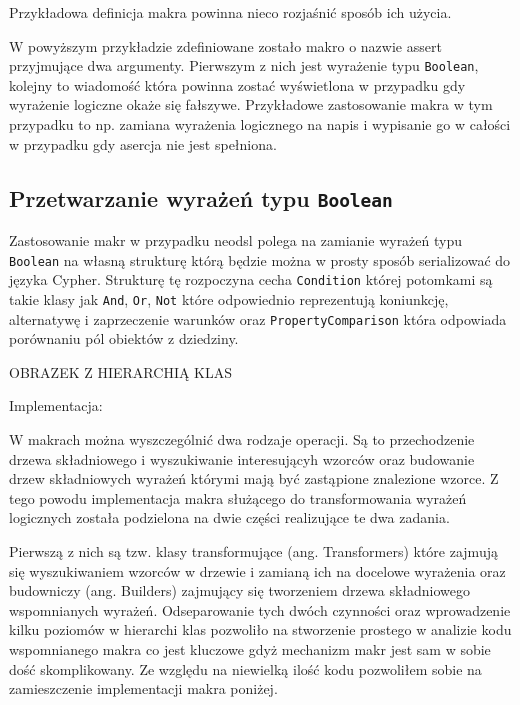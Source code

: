 \documentclass[brudnopis]{xmgr}
\begin{document}
Przykładowa definicja makra powinna nieco rozjaśnić sposób ich użycia.



W powyższym przykładzie zdefiniowane zostało makro o nazwie assert przyjmujące dwa argumenty. Pierwszym z nich jest wyrażenie typu \texttt{Boolean}, kolejny to wiadomość która powinna zostać wyświetlona w przypadku gdy wyrażenie logiczne okaże się fałszywe. Przykładowe zastosowanie makra w tym przypadku to np. zamiana wyrażenia logicznego na napis i wypisanie go w całości w przypadku gdy asercja nie jest spełniona.

\subsection{Przetwarzanie wyrażeń typu \texttt{Boolean}}

Zastosowanie makr w przypadku neodsl polega na zamianie wyrażeń typu \texttt{Boolean} na własną strukturę którą będzie można w prosty sposób serializować do języka Cypher. 
Strukturę tę rozpoczyna cecha \texttt{Condition} której potomkami są takie klasy jak \texttt{And}, \texttt{Or}, \texttt{Not} które odpowiednio reprezentują koniunkcję, alternatywę i zaprzeczenie warunków oraz \texttt{PropertyComparison} która odpowiada porównaniu pól obiektów z dziedziny.

OBRAZEK Z HIERARCHIĄ KLAS

Implementacja:

W makrach można wyszczególnić dwa rodzaje operacji. Są to przechodzenie drzewa składniowego i wyszukiwanie interesującyh wzorców oraz budowanie drzew składniowych wyrażeń którymi mają być zastąpione znalezione wzorce. Z tego powodu implementacja makra służącego do transformowania wyrażeń logicznych została podzielona na dwie części realizujące te dwa zadania.

Pierwszą z nich są tzw. klasy transformujące (ang. Transformers) które zajmują się wyszukiwaniem wzorców w drzewie i zamianą ich na docelowe wyrażenia oraz budowniczy (ang. Builders) zajmujący się tworzeniem drzewa składniowego wspomnianych wyrażeń. Odseparowanie tych dwóch czynności oraz wprowadzenie kilku poziomów w hierarchi klas pozwoliło na stworzenie prostego w analizie kodu wspomnianego makra co jest kluczowe gdyż mechanizm makr jest sam w sobie dość skomplikowany.  Ze względu na niewielką ilość kodu pozwoliłem sobie na zamieszczenie implementacji makra poniżej.


\end{document}
